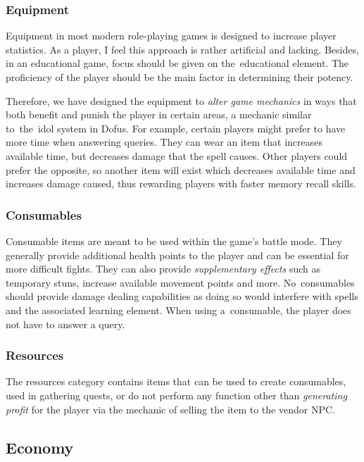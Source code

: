 \documentclass[thesis=B,english,hidelinks]{FITthesisXE}[2012/06/26]
\begin{document}
\subsubsection{Equipment}

Equipment in most modern role-playing games is designed to increase player statistics. As a player, I feel this approach is rather artificial and lacking. Besides, in an educational game, focus should be given on the~educational element. The proficiency of the player should be the main factor in determining their potency.

Therefore, we have designed the equipment to \emph{alter game mechanics} in ways that both benefit and punish the player in certain areas, a mechanic similar to~the~idol system in Dofus. For example, certain players might prefer to have more time when answering queries. They can wear an item that increases available time, but decreases damage that the spell causes. Other players could prefer the opposite, so another item will exist which decreases available time and increases damage caused, thus rewarding players with faster memory recall skills.

\subsubsection{Consumables}

Consumable items are meant to be used within the game's battle mode. They generally provide additional health points to the player and can be essential for more difficult fights. They can also provide \emph{supplementary effects} such as temporary stuns, increase available movement points and more. No~consumables should provide damage dealing capabilities as doing so would interfere with spells and the associated learning element. When using a~consumable, the player does not have to answer a query.

\subsubsection{Resources}

The resources category contains items that can be used to create consumables, used in gathering quests, or do not perform any function other than \emph{generating profit} for the player via the mechanic of selling the item to the vendor NPC.

\subsection{Economy}
\end{document}

